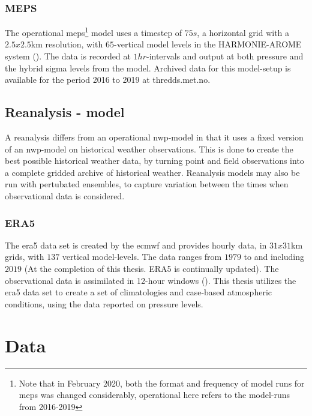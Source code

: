\subsubsection{MEPS}\label{sec:meps}
The operational \acrfull{meps}\footnote{Note that in February 2020, both the format and frequency of model runs for \acrfull{meps} was changed considerably, operational here refers to the model-runs from 2016-2019} model uses a timestep of $75s$, a horizontal grid with a $2.5x2.5$km resolution, with $65$-vertical model levels in the HARMONIE-AROME system (\cite{bengtsson2017}). The data is recorded at $1hr$-intervals and output at both pressure and the hybrid sigma levels from the model. Archived data for this model-setup is available for the period 2016 to 2019 at thredds.met.no.

\subsection{Reanalysis - model}\label{sec:ra}

A reanalysis differs from an operational \acrshort{nwp}-model in that it uses a fixed version of an \acrshort{nwp}-model on historical weather observations. This is done to create the best possible historical weather data, by turning point and field observations into a complete gridded archive of historical weather. Reanalysis models may also be run with pertubated ensembles, to capture variation between the times when observational data is considered.

\subsubsection{ERA5}\label{sec:era5}
The \acrfull{era5} data set is created by the \acrfull{ecmwf} and provides hourly data, in $31x31$km grids, with $137$ vertical model-levels. The data ranges from $1979$ to and including $2019$ (At the completion of this thesis. ERA5 is continually updated). The observational data is assimilated in 12-hour windows (\cite{hersbach2018}).
This thesis utilizes the \acrshort{era5} data set to create a set of climatologies and case-based atmospheric conditions, using the data reported on pressure levels.

\section{Data}\label{sec:data}


